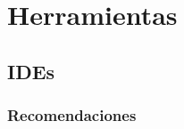 \documentclass[12pt]{report}
\begin{document}
	\sffamily
	\section{Herramientas}
		\subsection{IDEs}
			\subsubsection{Recomendaciones}
\end{document}
